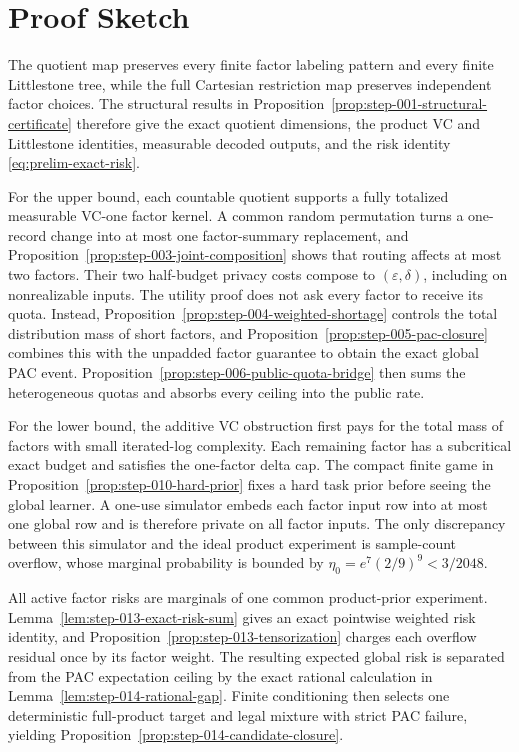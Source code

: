 \section{Proof Sketch}\label{sec:proof-sketch}

The quotient map preserves every finite factor labeling pattern and
every finite Littlestone tree, while the full Cartesian restriction map
preserves independent factor choices.  The structural results in
Proposition~\ref{prop:step-001-structural-certificate} therefore give
the exact quotient dimensions, the product VC and Littlestone
identities, measurable decoded outputs, and the risk identity
\eqref{eq:prelim-exact-risk}.

For the upper bound, each countable quotient supports a fully totalized
measurable VC-one factor kernel.  A common random permutation turns a
one-record change into at most one factor-summary replacement, and
Proposition~\ref{prop:step-003-joint-composition} shows that routing
affects at most two factors.  Their two half-budget privacy costs compose
to \((\varepsilon,\delta)\), including on nonrealizable inputs.
The utility proof does not ask every factor to receive its quota.
Instead, Proposition~\ref{prop:step-004-weighted-shortage} controls the
total distribution mass of short factors, and
Proposition~\ref{prop:step-005-pac-closure} combines this with the
unpadded factor guarantee to obtain the exact global PAC event.
Proposition~\ref{prop:step-006-public-quota-bridge} then sums the
heterogeneous quotas and absorbs every ceiling into the public rate.

For the lower bound, the additive VC obstruction first pays for the
total mass of factors with small iterated-log complexity.  Each
remaining factor has a subcritical exact budget and satisfies the
one-factor delta cap.  The compact finite game in
Proposition~\ref{prop:step-010-hard-prior} fixes a hard task prior
before seeing the global learner.  A one-use simulator embeds each
factor input row into at most one global row and is therefore private on
all factor inputs.  The only discrepancy between this simulator and the
ideal product experiment is sample-count overflow, whose marginal
probability is bounded by
\(\eta_0=e^7(2/9)^9<3/2048\).

All active factor risks are marginals of one common product-prior
experiment.  Lemma~\ref{lem:step-013-exact-risk-sum} gives an exact
pointwise weighted risk identity, and
Proposition~\ref{prop:step-013-tensorization} charges each overflow
residual once by its factor weight.  The resulting expected global risk
is separated from the PAC expectation ceiling by the exact rational
calculation in Lemma~\ref{lem:step-014-rational-gap}.  Finite
conditioning then selects one deterministic full-product target and
legal mixture with strict PAC failure, yielding
Proposition~\ref{prop:step-014-candidate-closure}.

